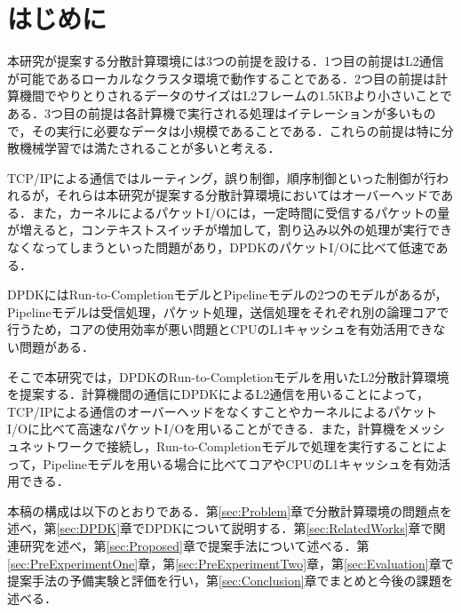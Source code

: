 \section{はじめに}
\label{sec:Background}
本研究が提案する分散計算環境には3つの前提を設ける．1つ目の前提はL2通信が可能であるローカルなクラスタ環境で動作することである．2つ目の前提は計算機間でやりとりされるデータのサイズはL2フレームの1.5KBより小さいことである．3つ目の前提は各計算機で実行される処理はイテレーションが多いもので，その実行に必要なデータは小規模であることである．これらの前提は特に分散機械学習では満たされることが多いと考える．

TCP/IPによる通信ではルーティング，誤り制御，順序制御といった制御が行われるが，それらは本研究が提案する分散計算環境においてはオーバーヘッドである．また，カーネルによるパケットI/Oには，一定時間に受信するパケットの量が増えると，コンテキストスイッチが増加して，割り込み以外の処理が実行できなくなってしまうといった問題があり，DPDKのパケットI/Oに比べて低速である．

DPDKにはRun-to-CompletionモデルとPipelineモデルの2つのモデルがあるが，Pipelineモデルは受信処理，パケット処理，送信処理をそれぞれ別の論理コアで行うため，コアの使用効率が悪い問題とCPUのL1キャッシュを有効活用できない問題がある．

そこで本研究では，DPDKのRun-to-Completionモデルを用いたL2分散計算環境を提案する．計算機間の通信にDPDKによるL2通信を用いることによって，TCP/IPによる通信のオーバーヘッドをなくすことやカーネルによるパケットI/Oに比べて高速なパケットI/Oを用いることができる．また，計算機をメッシュネットワークで接続し，Run-to-Completionモデルで処理を実行することによって，Pipelineモデルを用いる場合に比べてコアやCPUのL1キャッシュを有効活用できる．

本稿の構成は以下のとおりである．第\ref{sec:Problem}章で分散計算環境の問題点を述べ，第\ref{sec:DPDK}章でDPDKについて説明する．第\ref{sec:RelatedWorks}章で関連研究を述べ，第\ref{sec:Proposed}章で提案手法について述べる．第\ref{sec:PreExperimentOne}章，第\ref{sec:PreExperimentTwo}章，第\ref{sec:Evaluation}章で提案手法の予備実験と評価を行い，第\ref{sec:Conclusion}章でまとめと今後の課題を述べる．
